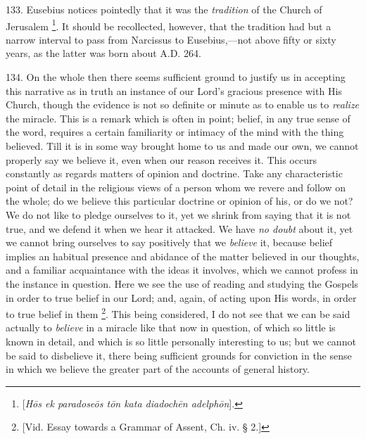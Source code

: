 133.
Eusebius notices pointedly that it was the \emph{tradition} of the
Church of Jerusalem \footnote{[\emph{H\={o}s ek paradose\={o}s t\={o}n kata diadoch\={e}n
adelph\={o}n}].}. It
should be recollected, however, that the tradition had but a narrow
interval to pass from Narcissus to Eusebius,—not above fifty or
sixty years, as the latter was born about A.D.
264.

134.
On the whole then there seems sufficient ground to justify us in
accepting this narrative as in truth an instance of our Lord's
gracious presence with His Church, though the evidence is not so
definite or minute as to enable us to \emph{realize} the miracle. This
is a remark which is often in point; belief, in any true sense of the
word, requires a certain familiarity or intimacy of the mind with the
thing believed. Till it is in some way brought home to us and made our
own, we cannot properly say we believe it, even when our reason
receives it. This occurs constantly as regards matters of opinion and
doctrine. Take any characteristic point of detail in the religious
views of a person whom we revere and follow on the whole; do we
believe this particular doctrine or opinion of his, or do we not? We
do not like to pledge ourselves to it, yet we shrink from saying that
it is not true, and we defend it when we hear it attacked. We have \emph{no
doubt} about it, yet we cannot bring ourselves to say positively
that we \emph{believe} it, because belief implies an habitual presence
and abidance of the matter believed in our thoughts, and a familiar
acquaintance with the ideas it involves, which we cannot profess in
the instance in question. Here we see the use of reading and studying
the Gospels in order to true belief in our Lord; and, again, of acting
upon His words, in order to true belief in them \footnote{[Vid. Essay towards a Grammar of Assent, Ch.
iv. § 2.]}. This being considered, I do not see that we can be said
actually to \emph{believe} in a miracle like that now in question, of
which so little is known in detail, and which is so little
personally interesting to us; but we cannot be said to disbelieve it,
there being sufficient grounds for conviction in the sense in which we
believe the greater part of the accounts of general history.


